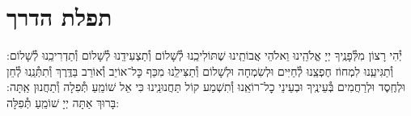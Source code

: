 \documentclass[twoside, openany, parskip=half, 11pt]{book}
\begin{document}
%
%
%
%

\chapter{תפלת הדרך}

יְ֯הִי רָצוֹן מִלְּ֯פָנֶֽיךָ יְיָ אֱלֹהֵֽינוּ וֵאלֹהֵי אֲבוֹתֵֽינוּ שֶׁתּוֹלִיכֵֽנוּ לְ֯שָׁלוֹם וְ֯תַצְעִידֵֽנוּ לְ֯שָׁלוֹם וְ֯תַדְרִיכֵֽנוּ לְ֯שָׁלוֹם: וְ֯תַגִּיעֵֽנוּ לִמְחוֹז חֶפְצֵֽנוּ לְ֯חַיִּים וּלְשִׂמְחָה וּלְשָׁלוֹם וְ֯תַצִּילֵֽנוּ מִכַּף כׇּל־אוֹיֵב וְ֯אוֹרֵב בַּדֶּֽרֶךְ וְ֯תִתְּ֯נֵֽנוּ לְ֯חֵן וּלְחֶֽסֶד וּלְרַחֲמִים בְּ֯עֵינֶֽיךָ וּבְעֵינֵי כׇל־רוֹאֵֽנוּ וְ֯תִשְׁמַע קוֹל תַּחֲנוּנֵֽינוּ כִּי אֵל שׁוֹמֵֽעַ תְּ֯פִלָה וְ֯תַחֲנוּן אַֽתָּה: בָּרוּךְ אַתָּה יְיָ שׁוֹמֵֽעַ תְּ֯פִלָּה:\\

\clearpage

\blankpage
\end{document}
